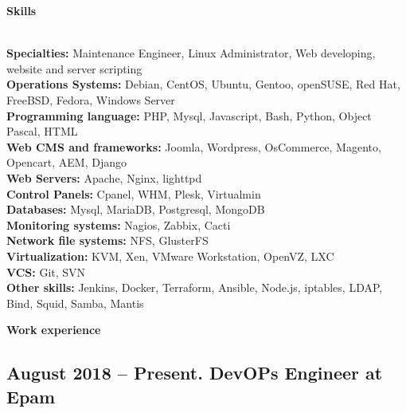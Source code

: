 \documentclass[letterpaper]{article}
\renewcommand{\section}[1]{
  {
    \large \colorbox{my-gray}{
      \begin{minipage}
        {\textwidth-0.175in}
        {\textbf{#1 \vphantom{p\^{E}}}}
      \end{minipage}
    }
  }
}
\begin{document}
\section{Skills}
\label{sec-1}\\
\label{sec-1-1}
\textbf{Specialties:} Maintenance Engineer, Linux Administrator, Web developing, website and server scripting\\
\label{sec-1-2}
\textbf{Operations Systems:} Debian, CentOS, Ubuntu, Gentoo, openSUSE, Red Hat, FreeBSD, Fedora, Windows Server\\
\label{sec-1-3}
\textbf{Programming language:} PHP, Mysql, Javascript, Bash, Python, Object Pascal, HTML\\
\label{sec-1-4}
\textbf{Web CMS and frameworks:} Joomla, Wordpress, OsCommerce, Magento, Opencart, AEM, Django\\
\label{sec-1-5}
\textbf{Web Servers:} Apache, Nginx, lighttpd\\
\label{sec-1-6}
\textbf{Control Panels:} Cpanel, WHM, Plesk, Virtualmin\\
\label{sec-1-7}
\textbf{Databases:} Mysql, MariaDB, Postgresql, MongoDB\\
\label{sec-1-8}
\textbf{Monitoring systems:} Nagios, Zabbix, Cacti\\
\label{sec-1-9}
\textbf{Network file systems:} NFS, GlusterFS\\
\label{sec-1-10}
\textbf{Virtualization:} KVM, Xen, VMware Workstation, OpenVZ, LXC\\
\label{sec-1-11}
\textbf{VCS:} Git, SVN\\
\label{sec-1-12}
\textbf{Other skills:}  Jenkins, Docker, Terraform, Ansible, Node.js, iptables, LDAP, Bind, Squid, Samba, Mantis\\
\section{Work experience}
\label{sec-2}
\subsection{{August 2018 – Present}. DevOPs Engineer at Epam}
\label{sec-2-1}
\end{document}
